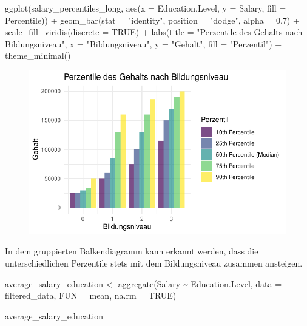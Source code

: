 \documentclass[
  letterpaper,
  DIV=11,
  numbers=noendperiod]{scrartcl}
\newenvironment{Shaded}{\begin{snugshade}}{\end{snugshade}}
\newcommand{\AttributeTok}[1]{\textcolor[rgb]{0.40,0.45,0.13}{#1}}
\newcommand{\ConstantTok}[1]{\textcolor[rgb]{0.56,0.35,0.01}{#1}}
\newcommand{\FloatTok}[1]{\textcolor[rgb]{0.68,0.00,0.00}{#1}}
\newcommand{\FunctionTok}[1]{\textcolor[rgb]{0.28,0.35,0.67}{#1}}
\newcommand{\NormalTok}[1]{\textcolor[rgb]{0.00,0.23,0.31}{#1}}
\newcommand{\OtherTok}[1]{\textcolor[rgb]{0.00,0.23,0.31}{#1}}
\newcommand{\SpecialCharTok}[1]{\textcolor[rgb]{0.37,0.37,0.37}{#1}}
\newcommand{\StringTok}[1]{\textcolor[rgb]{0.13,0.47,0.30}{#1}}
\begin{document}
\begin{Shaded}
\begin{Highlighting}[]
\FunctionTok{ggplot}\NormalTok{(salary\_percentiles\_long, }\FunctionTok{aes}\NormalTok{(}\AttributeTok{x =}\NormalTok{ Education.Level, }\AttributeTok{y =}\NormalTok{ Salary, }\AttributeTok{fill =}\NormalTok{ Percentile)) }\SpecialCharTok{+}
  \FunctionTok{geom\_bar}\NormalTok{(}\AttributeTok{stat =} \StringTok{"identity"}\NormalTok{, }\AttributeTok{position =} \StringTok{"dodge"}\NormalTok{, }\AttributeTok{alpha =} \FloatTok{0.7}\NormalTok{) }\SpecialCharTok{+}
  \FunctionTok{scale\_fill\_viridis}\NormalTok{(}\AttributeTok{discrete =} \ConstantTok{TRUE}\NormalTok{) }\SpecialCharTok{+}
  \FunctionTok{labs}\NormalTok{(}\AttributeTok{title =} \StringTok{"Perzentile des Gehalts nach Bildungsniveau"}\NormalTok{,}
       \AttributeTok{x =} \StringTok{"Bildungsniveau"}\NormalTok{,}
       \AttributeTok{y =} \StringTok{"Gehalt"}\NormalTok{,}
       \AttributeTok{fill =} \StringTok{"Perzentil"}\NormalTok{) }\SpecialCharTok{+}
  \FunctionTok{theme\_minimal}\NormalTok{()}
\end{Highlighting}
\end{Shaded}

\begin{figure}[H]

{\centering \includegraphics{main_doc_files/figure-pdf/unnamed-chunk-76-1.pdf}

}

\end{figure}

In dem gruppierten Balkendiagramm kann erkannt werden, dass die
unterschiedlichen Perzentile stets mit dem Bildungsniveau zusammen
ansteigen.

\begin{Shaded}
\begin{Highlighting}[]
\NormalTok{average\_salary\_education }\OtherTok{\textless{}{-}} \FunctionTok{aggregate}\NormalTok{(Salary }\SpecialCharTok{\textasciitilde{}}\NormalTok{ Education.Level, }\AttributeTok{data =}\NormalTok{ filtered\_data, }\AttributeTok{FUN =}\NormalTok{ mean, }\AttributeTok{na.rm =} \ConstantTok{TRUE}\NormalTok{)}

\NormalTok{average\_salary\_education}
\end{Highlighting}
\end{Shaded}
\end{document}
